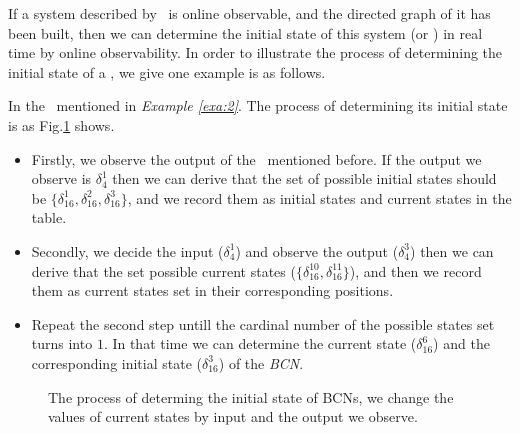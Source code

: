 If a system described by \BCN\ is online observable, and the directed graph of it has been built, then we can determine the initial state of this system (or \BCN) in real time by online observability. In order to illustrate the process of determining the initial state of a \BCN, we give one example is as follows.
\begin{example}
In the \BCN\ mentioned in {\em Example \ref{exa:2}}. The process of determining its initial state is as Fig.\ref{fig:5} shows. 
\begin{itemize}
  \item Firstly, we observe the output of the \BCN\ mentioned before. If the output we observe is $\delta_4^1$ then we can derive that the set of possible initial states should be $\{\delta_{16}^1,\delta_{16}^2,\delta_{16}^3\}$, and we record them as initial states and current states in the table. 
  \item Secondly, we decide the input ($\delta_4^1$) and observe the output ($\delta_4^3$) then we can derive that the set possible current states ($\{\delta_{16}^{10},\delta_{16}^{11}\}$), and then we record them as current states set in their corresponding positions. 
 \item Repeat the second step untill the cardinal number of the possible states set turns into $1$. In that time we can determine the current state ($\delta_{16}^{6}$) and the corresponding initial state  ($\delta_{16}^{3}$) of the {\em BCN}.
\end{itemize} 
\end{example}   

\begin{figure}[thpb]
      \centering
      
      \caption{The process of determing the initial state of BCNs, we change the values of current states by input and the output we observe. }
      \label{fig:5}
   \end{figure}



